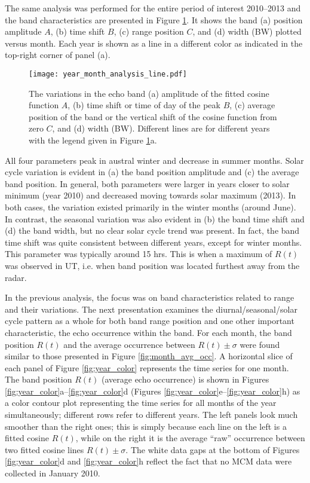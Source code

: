 The same analysis was performed for the entire period of interest 2010--2013 and the band characteristics are presented in Figure \ref{fig:year_line}. It shows the band (a) position amplitude \(A\), (b) time shift \(B\), (c) range position \(C\), and (d) width (BW) plotted versus month.  Each year is shown as a line in a different color as indicated in the top-right corner of panel (a).

\begin{figure}
\texttt{[image: year\_month\_analysis\_line.pdf]}
\caption{The variations in the echo band (a) amplitude of the fitted cosine function \(A\), (b) time shift or time of day of the peak \(B\), (c) average position of the band or the vertical shift of the cosine function from zero \(C\), and (d) width (BW). Different lines are for different years with the legend given in Figure \ref{fig:year_line}a.}
\label{fig:year_line}
\end{figure}

All four parameters peak in austral winter and decrease in summer months. Solar cycle variation is evident in (a) the band position amplitude and (c) the average band position. In general, both parameters were larger in years closer to solar minimum (year 2010) and decreased moving towards solar maximum (2013).  In both cases, the variation existed primarily in the winter months (around June). In contrast, the seasonal variation was also evident in (b) the band time shift and (d) the band width, but no clear solar cycle trend was present. In fact, the band time shift was quite consistent between different years, except for winter months. This parameter was typically around 15 hrs. This is when a maximum of \(R\left(t\right)\) was observed in UT, i.e. when band position was located furthest away from the radar.

In the previous analysis, the focus was on band characteristics related to range and their variations. The next presentation examines the diurnal/seasonal/solar cycle pattern as a whole for both band range position and one other important characteristic, the echo occurrence within the band. For each month, the band position \(R\left(t\right)\) and the average occurrence between \(R\left(t\right)\pm \sigma\) were found similar to those presented in Figure \ref{fig:month_avg_occ}. A horizontal slice of each panel of Figure \ref{fig:year_color} represents the time series for one month. The band position \(R\left(t\right)\) (average echo occurrence) is shown in Figures \ref{fig:year_color}a--\ref{fig:year_color}d (Figures \ref{fig:year_color}e--\ref{fig:year_color}h) as a color contour plot representing the time series for all months of the year simultaneously; different rows refer to  different years. The left panels look much smoother than the right ones; this is simply because each line on the left is a fitted cosine \(R\left(t\right)\), while on the right it is the average ``raw'' occurrence between two fitted cosine lines \(R\left(t\right)\pm \sigma\). The white data gaps at the bottom of Figures \ref{fig:year_color}d and \ref{fig:year_color}h reflect the fact that no MCM data were collected in January 2010.
	
